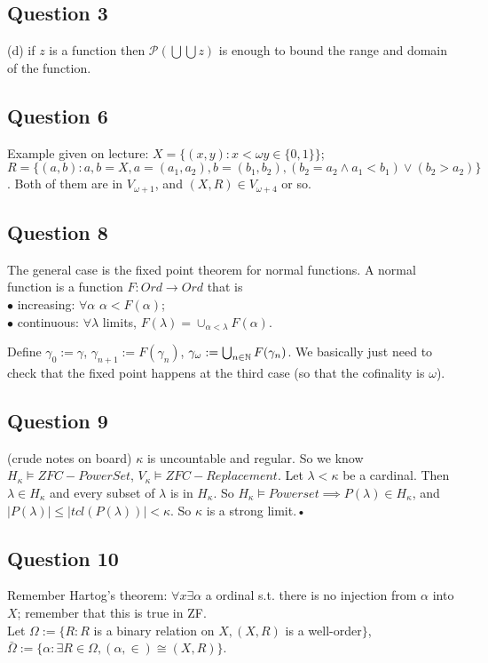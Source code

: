 \documentclass[a4paper]{article}
\begin{document}
\subsection{Question 3}
(d) if $z$ is a function then $\mathcal{P}(\bigcup\bigcup z)$ is enough to bound the range and domain of the function.

\subsection{Question 6}
Example given on lecture: $X=\{(x,y): x< \omega y \in \{0,1\}\}$;\\
$R=\{(a,b) : a,b = X, a=(a_1,a_2), b=(b_1,b_2), (b_2=a_2 \wedge a_1<b_1) \vee (b_2 > a_2)\}$. Both of them are in $V_{\omega +1}$, and $(X,R) \in V_{\omega+4}$ or so.

\subsection{Question 8}
The general case is the fixed point theorem for normal functions. A normal function is a function $F:Ord \to Ord$ that is\\
$\bullet$ increasing: $\forall \alpha$ $\alpha < F(\alpha)$;\\
$\bullet$ continuous: $\forall \lambda$ limits, $F(\lambda) = \cup_{\alpha < \lambda} F(\alpha)$.

Define $\gamma_0 := \gamma$, $\gamma_{n+1} := F(\gamma_n)$, $\gamma_\omega := \bigcup_{n \in \mathbb{N}} F(\gamma_n)$. We basically just need to check that the fixed point happens at the third case (so that the cofinality is $\omega$).

\subsection{Question 9}
(crude notes on board) $\kappa$ is uncountable and regular. So we know $H_\kappa \vDash ZFC-PowerSet$, $V_\kappa \vDash ZFC-Replacement$. Let $\lambda < \kappa$ be a cardinal. Then $\lambda \in H_\kappa$ and every subset of $\lambda$ is in $H_\kappa$. So $H_\kappa \vDash Powerset \implies P(\lambda) \in H_\kappa$, and $|P(\lambda)| \leq |tcl(P(\lambda))| < \kappa$. So $\kappa$ is a strong limit.•

\subsection{Question 10}

Remember Hartog's theorem: $\forall x \exists \alpha$ a ordinal s.t. there is no injection from $\alpha$ into $X$; remember that this is true in ZF.\\
Let $\Omega := \{R: R$ is a binary relation on $X, (X,R)$ is a well-order$\}$,\\
$\bar{\Omega} := \{\alpha: \exists R \in \Omega, (\alpha,\in)\cong (X,R)\}$.
\end{document}
